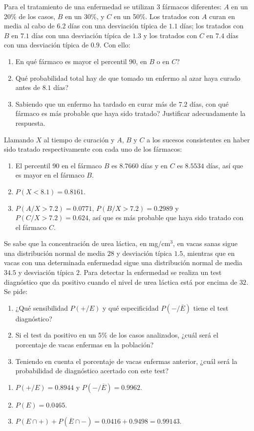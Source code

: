 {Para el tratamiento de una enfermedad se utilizan 3 fármacos diferentes: $A$ en un 20\% de los casos, $B$ en un 30\%, y $C$ en un 50\%. Los
tratados con $A$ curan en media al cabo de $6.2$ días con una desviación típica de $1.1$ días; los tratados con $B$ en $7.1$ días con una
desviación típica de $1.3$ y los tratados con $C$ en $7.4$ días con una desviación típica de $0.9$. Con ello:
\begin{enumerate}
\item En qué fármaco es mayor el percentil $90$, en $B$ o en $C$?
\item Qué probabilidad total hay de que tomado un enfermo al azar haya curado antes de $8.1$ días?
\item Sabiendo que un enfermo ha tardado en curar más de $7.2$ días, con qué fármaco es más probable que haya sido tratado? Justificar
adecuadamente la respuesta.
\end{enumerate}
}
{Llamando $X$ al tiempo de curación y $A$, $B$ y $C$ a los sucesos consistentes en haber sido tratado respectivamente con cada uno de los
fármacos:
\begin{enumerate}
\item El percentil 90 en el fármaco $B$ es $8.7660$ días y en $C$ es $8.5534$ días, así que es mayor en el fármaco $B$.
\item $P(X<8.1)=0.8161$.
\item $P(A/X>7.2)=0.0771$, $P(B/X>7.2)=0.2989$ y $P(C/X>7.2)=0.624$, así que es más probable que haya sido tratado con el fármaco $C$.
\end{enumerate}
}
{}


{Se sabe que la concentración de urea láctica, en mg/cm$^3$, en vacas sanas sigue una distribución normal de media $28$ y desviación típica
$1.5$, mientras que en vacas con una determinada enfermedad sigue una distribución normal de media $34.5$ y desviación típica $2$. Para
detectar la enfermedad se realiza un test diagnóstico que da positivo cuando el nivel de urea láctica está por encima de $32$. Se pide:
\begin{enumerate}
\item ¿Qué sensibilidad $P(+/E)$ y qué especificidad $P(-/\overline{E})$ tiene el test diagnóstico?
\item Si el test da positivo en un 5\% de los casos analizados, ¿cuál será el porcentaje de vacas enfermas en la población?
\item Teniendo en cuenta el porcentaje de vacas enfermas anterior, ¿cuál será la probabilidad de diagnóstico acertado con este test?
\end{enumerate}
}
{\begin{enumerate}
\item $P(+/E)=0.8944$ y $P(-/\overline E)=0.9962$.
\item $P(E)=0.0465$.
\item $P(E\cap +)+P(\overline E\cap -)= 0.0416 + 0.9498 = 0.99143$.
\end{enumerate}
}
{}



